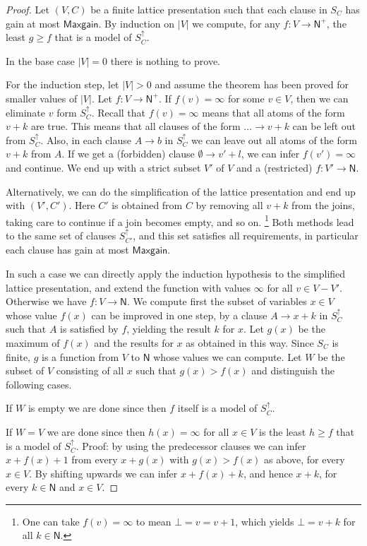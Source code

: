 \documentclass[11pt,a4paper]{article}
\newcommand{\N}{\mathsf{N}}
\newcommand\Ninf{\N^+}
\newcommand\M{\mathsf{Maxgain}}
\begin{document}
\begin{proof}
Let  $(V,C)$ be a finite lattice presentation
such that each clause in $S_C$ has gain at most $\M$.
By induction on $|V|$ we compute, for any $f: V\to\Ninf$,
the least $g \geq f$ that is a model of $S^\uparrow_C$.

In the base case $|V|=0$ there is nothing to prove.

For the induction step, let $|V|>0$ and assume the
theorem has been proved for smaller values of $|V|$.
Let $f: V\to\Ninf$. If $f(v)=\infty$ for some $v\in V$,
then we can eliminate $v$ form $S^\uparrow_C$. Recall that
$f(v)=\infty$ means that all atoms of the form $v+k$
are true. This means that all clauses of the form
$\ldots\to v+k$ can be left out from $S^\uparrow_C$.
Also, in each clause $A\to b$ in $S^\uparrow_C$
we can leave out all atoms of the form $v+k$ from $A$.
If we get a (forbidden) clause $\emptyset\to v'+l$,
we can infer $f(v')=\infty$ and continue.
We end up with a strict subset $V'$ of $V$ and a (restricted)
$f : V' \to \N$.

Alternatively, we can do the simplification of the lattice
presentation and end up with $(V',C')$. Here $C'$
is obtained from $C$ by removing all $v+k$ from the joins,
taking care to continue if a join becomes empty, and so on.%
\footnote{One can take $f(v)=\infty$ to mean $\bot=v=v+1$,
which yields $\bot=v+k$ for all $k\in\N$.}
Both methods lead to the same set of clauses $S^\uparrow_{C'}$,
and this set satisfies all requirements, in particular
each clause has gain at most $\M$.

In such a case we can directly apply the induction hypothesis
to the simplified lattice presentation, and extend the
function with values $\infty$ for all $v \in V-V'$.
Otherwise we have $f: V\to\N$.
We compute first the subset of variables $x\in V$ 
whose value $f(x)$ can be improved in one step,
by a clause $A\to x+k$ in $S^\uparrow_C$ such that $A$ is
satisfied by $f$, yielding the result $k$ for $x$. 
Let $g(x)$ be the maximum of $f(x)$ and the results
for $x$ as obtained in this way. Since $S_C$ is finite,
$g$ is a function from $V$ to $\N$ whose values we can
compute. Let $W$ be the subset of $V$ consisting of
all $x$ such that $g(x) > f(x)$ and distinguish the
following cases.

If $W$ is empty we are done since then $f$ itself 
is a model of $S^\uparrow_C$.

If $W = V$ we are done since then $h(x) = \infty$ for all 
$x \in V$ is the least $h \geq f$ that is a model of $S^\uparrow_C$.
Proof: by using the predecessor clauses we can infer
$x+f(x)+1$ from every $x+g(x)$ with $g(x)>f(x)$ as above,
for every $x\in V$. By shifting upwards we can infer
$x+f(x)+k$, and hence $x+k$, for every $k\in\N$ and $x\in V$.


\end{proof}
\end{document}
